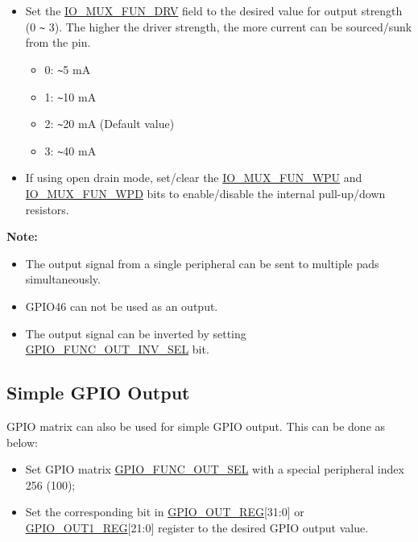 \documentclass[main\_\_EN.tex]{subfiles}
\begin{document}
\begin{enumerate}
\begin{itemize}
        \item Set the \hyperref[fielddesc:IOMUXFUNDRV]{IO\_MUX\_FUN\_DRV} field to the desired value for output strength (0 \verb+~+ 3). The higher the driver strength, the more current can be sourced/sunk from the pin.
        \begin{itemize}
            \item 0: \verb+~+5 mA
            \item 1: \verb+~+10 mA
            \item 2: \verb+~+20 mA (Default value)
            \item 3: \verb+~+40 mA
        \end{itemize}
        \item If using open drain mode, set/clear the \hyperref[fielddesc:IOMUXFUNWPU]{IO\_MUX\_FUN\_WPU} and \hyperref[fielddesc:IOMUXFUNWPD]{IO\_MUX\_FUN\_WPD} bits to enable/disable the internal pull-up/down resistors.
    \end{itemize}
\end{enumerate}

{\bfseries Note:}
\begin{itemize}
\item The output signal from a single peripheral can be sent to multiple pads simultaneously.
\item GPIO46 can not be used as an output.
\item The output signal can be inverted by setting \hyperref[fielddesc:GPIOFUNCNOUTINVSEL]{GPIO\_FUNC\_OUT\_INV\_SEL} bit.
\end{itemize}

\subsection{Simple GPIO Output}

GPIO matrix can also be used for simple GPIO output. This can be done as below:

\begin{itemize}
    \item Set GPIO matrix \hyperref[fielddesc:GPIOFUNCNOUTSEL]{GPIO\_FUNC\_OUT\_SEL} with a special peripheral index 256 (\hexprefix{}100);
    \item Set the corresponding bit in \hyperref[regdesc:GPIOOUTREG]{GPIO\_OUT\_REG}[31:0] or \hyperref[regdesc:GPIOOUT1REG]{GPIO\_OUT1\_REG}[21:0] register to the desired GPIO output value.
\end{itemize}
\end{document}
